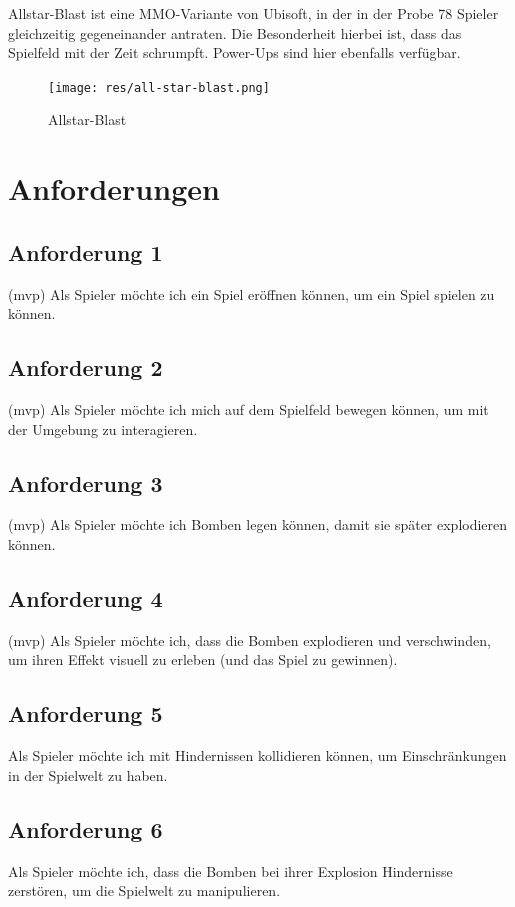\documentclass[conference]{IEEEtran}
\begin{document}
Allstar-Blast \cite{allstarblast} ist eine MMO-Variante von Ubisoft, in der in der Probe 78 Spieler gleichzeitig gegeneinander antraten. Die Besonderheit hierbei ist, dass das Spielfeld mit der Zeit schrumpft. Power-Ups sind hier ebenfalls verfügbar.
\begin{figure}[H]
    \centering
    \texttt{[image: res/all-star-blast.png]}
    \caption{Allstar-Blast}
\end{figure}


\section{Anforderungen}

\subsection{Anforderung 1} (mvp)
Als Spieler möchte ich ein Spiel eröffnen können, um ein Spiel spielen zu können.

\subsection{Anforderung 2} (mvp)
Als Spieler möchte ich mich auf dem Spielfeld bewegen können, um mit der Umgebung zu interagieren.

\subsection{Anforderung 3} (mvp)
Als Spieler möchte ich Bomben legen können, damit sie später explodieren können.

\subsection{Anforderung 4} (mvp)
Als Spieler möchte ich, dass die Bomben explodieren und verschwinden, um ihren Effekt visuell zu erleben (und das Spiel zu gewinnen).

\subsection{Anforderung 5} 
Als Spieler möchte ich mit Hindernissen kollidieren können, um Einschränkungen in der Spielwelt zu haben.

\subsection{Anforderung 6}
Als Spieler möchte ich, dass die Bomben bei ihrer Explosion Hindernisse zerstören, um die Spielwelt zu manipulieren.
\end{document}

